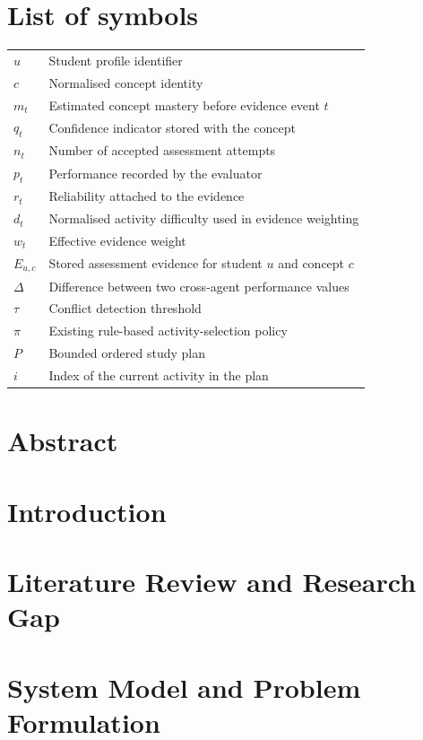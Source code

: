 \documentclass[a4paper,12pt]{report}
\begin{document}
\chapter*{List of symbols}
\begin{longtable}{P{0.22\textwidth}P{0.71\textwidth}}
$u$ & Student profile identifier\\
$c$ & Normalised concept identity\\
$m_t$ & Estimated concept mastery before evidence event $t$\\
$q_t$ & Confidence indicator stored with the concept\\
$n_t$ & Number of accepted assessment attempts\\
$p_t$ & Performance recorded by the evaluator\\
$r_t$ & Reliability attached to the evidence\\
$d_t$ & Normalised activity difficulty used in evidence weighting\\
$w_t$ & Effective evidence weight\\
$E_{u,c}$ & Stored assessment evidence for student $u$ and concept $c$\\
$\Delta$ & Difference between two cross-agent performance values\\
$\tau$ & Conflict detection threshold\\
$\pi$ & Existing rule-based activity-selection policy\\
$P$ & Bounded ordered study plan\\
$i$ & Index of the current activity in the plan\\
\end{longtable}
\chapter*{Abstract}

\clearpage
{}
\chapter{Introduction}
\chapter{Literature Review and Research Gap}
\chapter{System Model and Problem Formulation}
\end{document}
